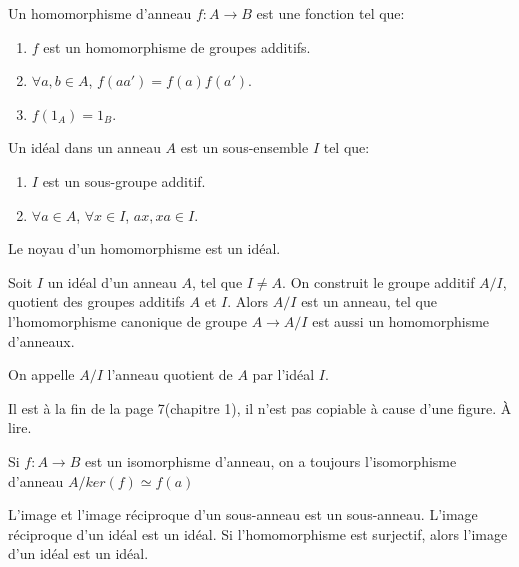\documentclass[12pt,a4paper]{article}
\begin{document}
\begin{flushleft}
\begin{mydef}
Un homomorphisme d'anneau $f:A\longrightarrow B$ est une fonction tel que:
\begin{enumerate}
\item $f$ est un homomorphisme de groupes additifs.
\item $\forall a,b \in A$, $f(aa')=f(a)f(a')$.
\item $f(1_A) = 1_B$.
\end{enumerate}
\end{mydef}

\begin{mydef}
Un idéal dans un anneau $A$ est un sous-ensemble $I$ tel que:
\begin{enumerate}
\item $I$ est un sous-groupe additif.
\item $\forall a \in A$, $\forall x \in I$, $ax, xa \in I$.
\end{enumerate}
\end{mydef}

\begin{prop}
Le noyau d'un homomorphisme est un idéal.
\end{prop}

\begin{prop}
Soit $I$ un idéal d'un anneau $A$, tel que $I \neq A$. On construit le groupe additif $A/I$, quotient des groupes additifs $A$ et $I$. Alors $A/I$ est un anneau, tel que l'homomorphisme canonique de groupe $A \longrightarrow A/I$ est aussi un homomorphisme d'anneaux.
\end{prop}

\begin{mydef}
On appelle $A/I$ l'anneau quotient de $A$ par l'idéal $I$.
\end{mydef}

\begin{thm}
Il est à la fin de la page 7(chapitre 1), il n'est pas copiable à cause d'une figure. À lire.
\end{thm}

\begin{cor}
Si $f: A\longrightarrow B$ est un isomorphisme d'anneau, on a toujours l'isomorphisme d'anneau $A/ker(f) \simeq f(a)$
\end{cor}

\begin{prop}
L'image et l'image réciproque d'un sous-anneau est un sous-anneau. L'image réciproque d'un idéal est un idéal. Si l'homomorphisme est surjectif, alors l'image d'un idéal est un idéal.
\end{prop}


\end{flushleft}
\end{document}
